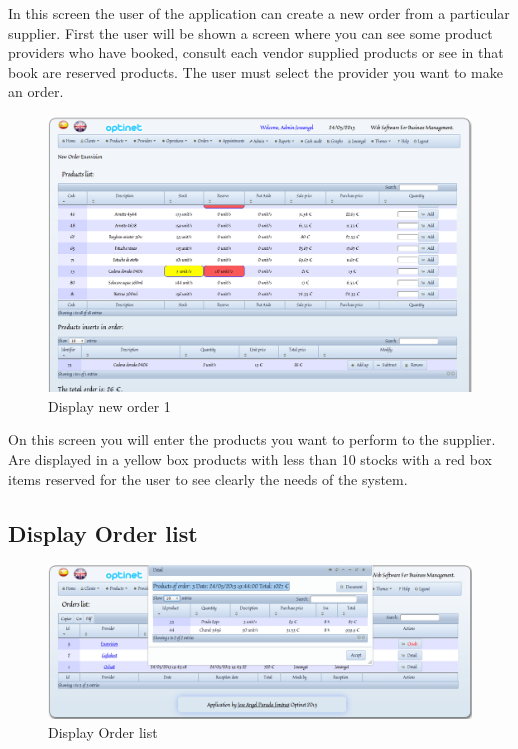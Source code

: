 \documentclass[a4paper,11pt]{book}
\begin{document}
In this screen the user of the application can create a new order from a particular supplier. First the user will be shown a screen where you can see some product providers who have booked, consult each vendor supplied products or see in that book are reserved products. The user must select the provider you want to make an order.

\newpage
\begin{figure}[!htb]
  \centering
    \includegraphics[scale=0.35]{icapnuevopedido1.png}
  \caption{Display new order 1}
  \label{a}
\end{figure}

On this screen you will enter the products you want to perform to the supplier. Are displayed in a yellow box products with less than 10 stocks with a red box items reserved for the user to see clearly the needs of the system.

\subsection {Display Order list}

\begin{figure}[!htb]
  \centering
    \includegraphics[scale=0.35]{icaplistarpedidos.png}
  \caption{Display Order list}
  \label{a}
\end{figure}
\end{document}
